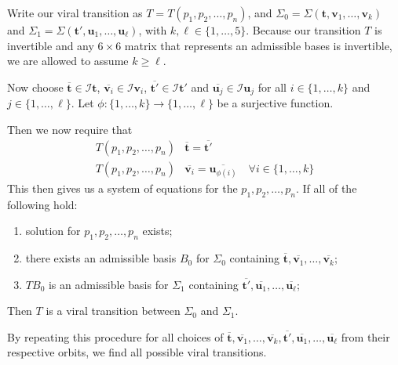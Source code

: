 \documentclass[a4paper,10pt]{article}
\theoremstyle{plain}
\theoremstyle{definition}
\theoremstyle{remark}
\renewcommand{\vec}[1]{\textbf{#1}}
\begin{document}
Write our viral transition as \(T = T(p_1, p_2, \dots, p_n)\), and \(\Sigma_0 = \Sigma(\vec{t}, \vec{v}_1, \dots, \vec{v}_k)\) and \(\Sigma_1 = \Sigma(\vec{t}', \vec{u}_1, \dots, \vec{u}_\ell)\), with \(k, \ell \in \{1, \dots, 5\}\).
Because our transition \(T\) is invertible and any \(6 \times 6\) matrix that represents an admissible bases is invertible, we are allowed to assume \(k \geq \ell\).

Now choose \(\overline{\vec{t}} \in \mathcal{I}\vec{t}\), \(\overline{\vec{v}_i} \in \mathcal{I}\vec{v}_i\), \(\overline{\vec{t}'} \in \mathcal{I}\vec{t}'\) and \(\overline{\vec{u}_j} \in \mathcal{I}\vec{u}_j\) for all \(i \in \{1, \dots, k\}\) and \(j \in \{1, \dots, \ell\}\).
Let \(\phi\colon \{1, \dots, k\} \to \{1, \dots, \ell\}\) be a surjective function.

Then we now require that
\begin{align}
    T(p_1, p_2, \dots, p_n)&\overline{\vec{t}} = \overline{\vec{t}'} \\
    T(p_1, p_2, \dots, p_n)&\overline{\vec{v}_i} = \overline{\vec{u}_{\phi(i)}} \quad\forall i \in \{1, \dots, k\}
\end{align}
This then gives us a system of equations for the \(p_1, p_2, \dots, p_n\).
If all of the following hold:
\begin{enumerate}
    \item solution for \(p_1, p_2, \dots, p_n\) exists;
    \item there exists an admissible basis \(B_0\) for \(\Sigma_0\) containing \(\overline{\vec{t}}, \overline{\vec{v}_1}, \dots, \overline{\vec{v}_k}\);
    \item \(TB_0\) is an admissible basis for \(\Sigma_1\) 
        containing \(\overline{\vec{t}'}, \overline{\vec{u}_1}, \dots, \overline{\vec{u}_{\ell}}\); %
\end{enumerate}
Then \(T\) is a viral transition between \(\Sigma_0\) and \(\Sigma_1\).

By repeating this procedure for all choices of \(\overline{\vec{t}}, \overline{\vec{v}_1}, \dots, \overline{\vec{v}_k}, \overline{\vec{t}'}, \overline{\vec{u}_1}, \dots, \overline{\vec{u}_\ell}\) from their respective orbits, we find all possible viral transitions.
\end{document}
